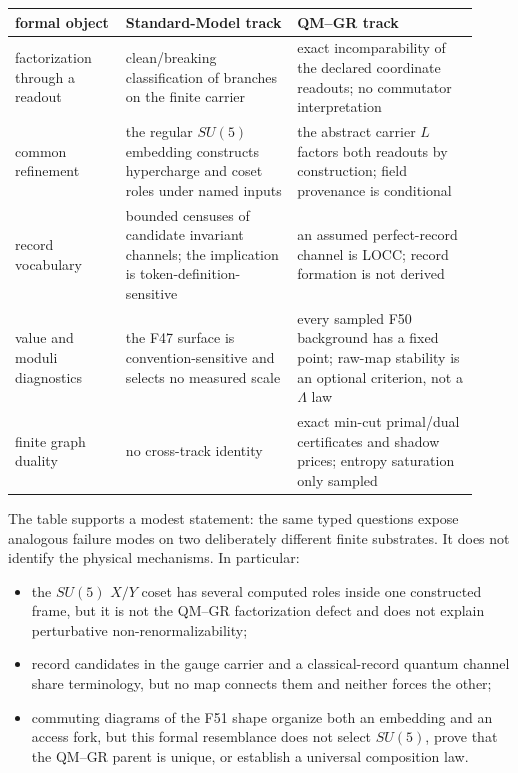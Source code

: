 \begin{center}
\small
\begin{longtable}[]{@{}p{0.22\linewidth}p{0.34\linewidth}p{0.36\linewidth}@{}}
\toprule
formal object & Standard-Model track & QM--GR track\\
\midrule
\endhead
factorization through a readout & clean/breaking classification of branches on the finite carrier & exact
incomparability of the declared coordinate readouts; no commutator interpretation\\
common refinement & the regular \(SU(5)\) embedding constructs hypercharge and coset roles under named inputs & the
abstract carrier \(L\) factors both readouts by construction; field provenance is conditional\\
record vocabulary & bounded censuses of candidate invariant channels; the implication is token-definition-sensitive &
an assumed perfect-record channel is LOCC; record formation is not derived\\
value and moduli diagnostics & the F47 surface is convention-sensitive and selects no measured scale & every sampled F50
background has a fixed point; raw-map stability is an optional criterion, not a \(\Lambda\) law\\
finite graph duality & no cross-track identity & exact min-cut primal/dual certificates and shadow prices; entropy
saturation only sampled\\
\bottomrule
\end{longtable}
\end{center}

The table supports a modest statement: the same typed questions expose analogous failure modes on two deliberately
different finite substrates. It does not identify the physical mechanisms. In particular:

\begin{itemize}\tightlist
\item the \(SU(5)\) \(X/Y\) coset has several computed roles inside one constructed frame, but it is not the QM--GR
  factorization defect and does not explain perturbative non-renormalizability;
\item record candidates in the gauge carrier and a classical-record quantum channel share terminology, but no map
  connects them and neither forces the other;
\item commuting diagrams of the F51 shape organize both an embedding and an access fork, but this formal resemblance
  does not select \(SU(5)\), prove that the QM--GR parent is unique, or establish a universal composition law.
\end{itemize}


